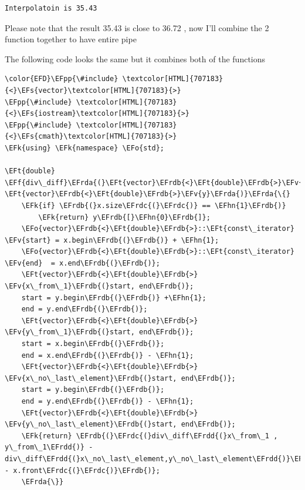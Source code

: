 \documentclass[11pt]{article}
\newcommand{\EFs}[1]{\textcolor{EFs}{#1}} %
\newcommand{\EFk}[1]{\textcolor{EFk}{#1}} %
\newcommand{\EFf}[1]{\textcolor{EFf}{#1}} %
\newcommand{\EFv}[1]{\textcolor{EFv}{#1}} %
\newcommand{\EFt}[1]{\textcolor{EFt}{#1}} %
\newcommand{\EFo}[1]{\textcolor{EFo}{#1}} %
\newcommand{\EFpp}[1]{\textcolor{EFpp}{#1}} %
\newcommand{\EFhn}[1]{\textcolor{EFhn}{#1}} %
\newcommand{\EFrda}[1]{\textcolor{EFrda}{#1}} %
\newcommand{\EFrdb}[1]{\textcolor{EFrdb}{#1}} %
\newcommand{\EFrdc}[1]{\textcolor{EFrdc}{#1}} %
\newcommand{\EFrdd}[1]{\textcolor{EFrdd}{#1}} %
\begin{document}
\begin{verbatim}
Interpolatoin is 35.43
\end{verbatim}


Please note that the result 35.43 is close to 36.72 , now I'll combine the 2 function together to have entire pipe


The following code looks the same but it combines both of the functions

\begin{Code}
\begin{Verbatim}
\color{EFD}\EFpp{\#include} \textcolor[HTML]{707183}{<}\EFs{vector}\textcolor[HTML]{707183}{>}
\EFpp{\#include} \textcolor[HTML]{707183}{<}\EFs{iostream}\textcolor[HTML]{707183}{>}
\EFpp{\#include} \textcolor[HTML]{707183}{<}\EFs{cmath}\textcolor[HTML]{707183}{>}
\EFk{using} \EFk{namespace} \EFo{std};

\EFt{double} \EFf{div\_diff}\EFrda{(}\EFt{vector}\EFrdb{<}\EFt{double}\EFrdb{>}\EFv{x}, \EFt{vector}\EFrdb{<}\EFt{double}\EFrdb{>}\EFv{y}\EFrda{)}\EFrda{\{}
    \EFk{if} \EFrdb{(}x.size\EFrdc{(}\EFrdc{)} == \EFhn{1}\EFrdb{)}
        \EFk{return} y\EFrdb{[}\EFhn{0}\EFrdb{]};
    \EFo{vector}\EFrdb{<}\EFt{double}\EFrdb{>}::\EFt{const\_iterator} \EFv{start} = x.begin\EFrdb{(}\EFrdb{)} + \EFhn{1};
    \EFo{vector}\EFrdb{<}\EFt{double}\EFrdb{>}::\EFt{const\_iterator} \EFv{end}  = x.end\EFrdb{(}\EFrdb{)};
    \EFt{vector}\EFrdb{<}\EFt{double}\EFrdb{>} \EFv{x\_from\_1}\EFrdb{(}start, end\EFrdb{)};
    start = y.begin\EFrdb{(}\EFrdb{)} +\EFhn{1};
    end = y.end\EFrdb{(}\EFrdb{)};
    \EFt{vector}\EFrdb{<}\EFt{double}\EFrdb{>} \EFv{y\_from\_1}\EFrdb{(}start, end\EFrdb{)};
    start = x.begin\EFrdb{(}\EFrdb{)};
    end = x.end\EFrdb{(}\EFrdb{)} - \EFhn{1};
    \EFt{vector}\EFrdb{<}\EFt{double}\EFrdb{>} \EFv{x\_no\_last\_element}\EFrdb{(}start, end\EFrdb{)};
    start = y.begin\EFrdb{(}\EFrdb{)};
    end = y.end\EFrdb{(}\EFrdb{)} - \EFhn{1};
    \EFt{vector}\EFrdb{<}\EFt{double}\EFrdb{>} \EFv{y\_no\_last\_element}\EFrdb{(}start, end\EFrdb{)};
    \EFk{return} \EFrdb{(}\EFrdc{(}div\_diff\EFrdd{(}x\_from\_1 , y\_from\_1\EFrdd{)} - div\_diff\EFrdd{(}x\_no\_last\_element,y\_no\_last\_element\EFrdd{)}\EFrdc{)}\EFrdb{)}/\EFrdb{(}x.back\EFrdc{(}\EFrdc{)} - x.front\EFrdc{(}\EFrdc{)}\EFrdb{)};
    \EFrda{\}}


\end{Verbatim}
\end{Code}
\end{document}
